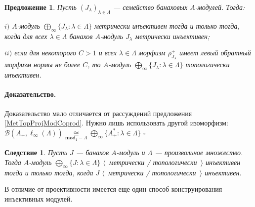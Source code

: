 \documentclass[12pt]{article}
\newcommand{\isom}[1]{\mathop{\mathbin{\cong}}\limits_{#1}}
\newtheorem{proposition}[theorem]{Предложение}
\newtheorem{corollary}[theorem]{Следствие}
\renewenvironment{proof}{\paragraph{Доказательство.}}{\hfill$\square$\medskip}
\begin{document}
\begin{proposition}\label{MetTopInjModProd} Пусть $(J_\lambda)_{\lambda\in\Lambda}$ --- семейство банаховых $A$-модулей. Тогда:

$i)$ $A$-модуль $\bigoplus_\infty\{J_\lambda:\lambda\in\Lambda\}$ метрически инъективен тогда и только тогда, когда для всех $\lambda\in\Lambda$ банахов $A$-модуль $J_\lambda$ метрически инъективен;

$ii)$ если для некоторого $C>1$ и всех $\lambda\in\Lambda$  морфизм $\rho_{J_\lambda}^+$ имеет левый обратный морфизм нормы не более $C$, то $A$-модуль $\bigoplus_\infty\{J_\lambda:\lambda\in\Lambda\}$ топологически инъективен.
\end{proposition}
\begin{proof} Доказательство мало отличается от рассуждений предложения \ref{MetTopProjModCoprod}. Нужно лишь использовать другой изоморфизм: $\mathcal{B}(A_+,\ell_\infty(\Lambda))\isom{\mathbf{mod}_1-A}\bigoplus_\infty\{A_+^*:\lambda\in\Lambda\}$
\end{proof}

\begin{corollary}\label{MetTopInjlInftySum} Пусть $J$ --- банахов $A$-модуль и $\Lambda$ --- произвольное множество. Тогда $A$-модуль  $\bigoplus_\infty\{J:\lambda\in\Lambda\}$ $\langle$~метрически / топологически~$\rangle$ инъективен тогда и только тогда, когда $J$ $\langle$~метрически / топологически~$\rangle$ инъективен.
\end{corollary}

В отличие от проективности имеется еще один способ конструирования инъективных модулей.
\end{document}
